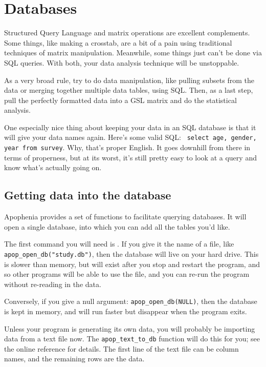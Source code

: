 \chapter{Databases} \label{sql}

Structured Query Language and matrix operations are excellent complements. Some things, like
making a crosstab, are a bit of a pain using traditional techniques of
matrix manipulation. Meanwhile, some things just can't be done via SQL
queries. With both, your data analysis technique will be unstoppable.

As a very broad rule, try to do data manipulation, like pulling subsets
from the data or merging together multiple data tables, using SQL. Then,
as a last step, pull the perfectly formatted data into a GSL matrix and
do the statistical analysis. 

One especially nice thing about keeping your data in an SQL database
is that it will give your data names again. Here's some valid SQL: {\tt
select age, gender, year from survey}. Why, that's proper English. It
goes downhill from there in terms of properness, but at its worst, it's
still pretty easy to look at a query and know what's actually going on.

\section{Getting data into the database}
Apophenia provides a set of functions to facilitate querying databases.
It will open a single database, into which you can add all the tables you'd like.

The first command you will need is . If you give
it the name of a file, like {\tt apop\_open\_db("study.db")}, then the
database will live on your hard drive. This is slower than memory, but
will exist after you stop and restart the program, and so other programs
will be able to use the file, and you can re-run the program without
re-reading in the data.

Conversely, if you give a null argument: {\tt apop\_open\_db(NULL)},
then the database is kept in memory, and will run faster but 
disappear when the program exits.


Unless your program is generating its own data, you will probably
be importing data from a text file now.  The {\tt apop\_text\_to\_db}
function will do this for you; see the online reference for details. The
first line of the text file can be column names, and the remaining rows
are the data.


